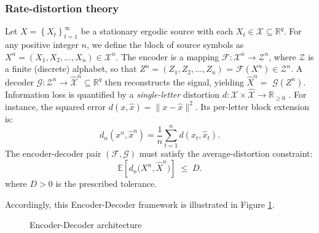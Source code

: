 \documentclass[12pt,review,authoryear]{elsarticle}
\theoremstyle{upright}
\begin{document}
\subsubsection{Rate-distortion theory}

Let $X=\left\{X_t\right\}_{t=1}^{\infty}$ be a stationary ergodic source with each $X_t \in \mathcal{X} \subseteq \mathbb{R}^q$. For any positive integer $n$, we define the block of source symbols as $X^n=\left(X_1, X_2, \ldots, X_n\right) \in \mathcal{X}^n$. The encoder is a mapping $\mathcal{F}: \mathcal{X}^n \rightarrow \mathcal{Z}^n$, where $\mathcal{Z}$ is a finite (discrete) alphabet, so that $Z^n =\left(Z_1, Z_2, \ldots, Z_n\right)$ = $\mathcal{F}\left(X^n\right) \in \mathcal{Z}^n$. A decoder $\mathcal{G}: \mathcal{Z}^n \rightarrow \hat{\mathcal{X}}^n \subseteq \mathbb{R}^q$ then reconstructs the signal, yielding $\hat{X}^n=$ $\mathcal{G}\left(Z^n\right)$. Information loss is quantified by a \emph{single-letter} distortion  
\(d:\mathcal{X}\times\hat{\mathcal{X}}\to\mathbb{R}_{\ge0}\)  
. For instance, the squared error \(d(x,\hat x)=\lVert x-\hat x\rVert^{2}\).  
Its per-letter block extension is: 
\[
d_{n}(x^{n},\hat x^{n})
=\frac{1}{n}\sum_{t=1}^{n} d(x_{t},\hat x_{t}).
\]
The encoder-decoder pair \((\mathcal{F},\mathcal{G})\) must satisfy the
average-distortion constraint:
\[
\mathbb{E}\!\left[d_{n}\!\bigl(X^{n},\hat X^{n}\bigr)\right]\;\le\;D.
\]
where \(D>0\) is the prescribed tolerance.

Accordingly, this Encoder-Decoder framework is illustrated in Figure \ref{fig:encoder_decoder_architecture}.

\begin{figure}[ht]
    \centering
    \caption{Encoder-Decoder architecture}
    \label{fig:encoder_decoder_architecture}
\end{figure}
\end{document}
